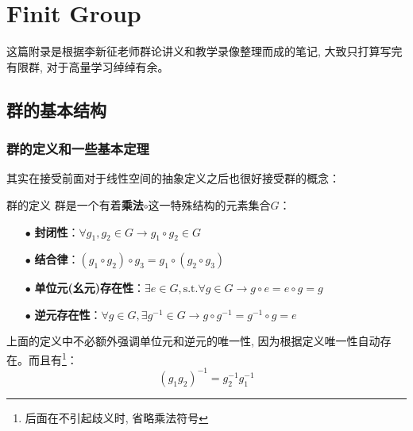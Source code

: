 
\chapter{Finit Group}
这篇附录是根据李新征老师群论讲义和教学录像整理而成的笔记, 大致只打算写完有限群, 对于高量学习绰绰有余。
\section{群的基本结构}
\subsection{群的定义和一些基本定理}
其实在接受前面对于线性空间的抽象定义之后也很好接受群的概念：
\begin{define}{群的定义}
    群是一个有着\textbf{乘法}$\circ$这一特殊结构的元素集合$G$：
    \begin{itemize}
    \item[$\bullet$] \textbf{封闭性}：$\forall g_1,g_2\in G\rightarrow g_1\circ g_2\in G$
    \item[$\bullet$] \textbf{结合律}：$(g_1\circ g_2)\circ g_3=g_1\circ (g_2\circ g_3)$
    \item[$\bullet$] \textbf{单位元(幺元)存在性}：$\exists e\in G,\mathrm{s.t.}\forall g\in G\rightarrow g\circ e=e\circ g=g$
    \item[$\bullet$] \textbf{逆元存在性}：$\forall g\in G,\exists g^{-1}\in G\rightarrow g\circ g^{-1}=g^{-1}\circ g=e$
    \end{itemize}
\end{define}
上面的定义中不必额外强调单位元和逆元的唯一性, 因为根据定义唯一性自动存在。而且有\footnote{后面在不引起歧义时, 省略乘法符号}：
\begin{equation*}
    (g_1g_2)^{-1}=g_2^{-1}g_1^{-1}
\end{equation*}

